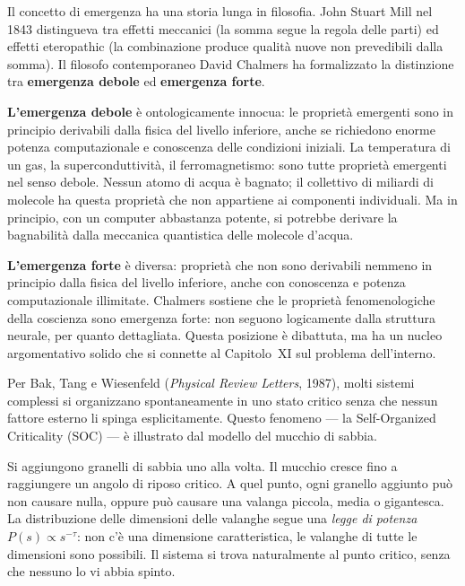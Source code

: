 \documentclass[12pt,a4paper,openany]{book}
\newcommand{\sezione}[1]{\vspace{1.2em}{\large\bfseries #1}\vspace{0.5em}\par}
\begin{document}
\sezione{Emergenza debole e emergenza forte}

Il concetto di emergenza ha una storia lunga in filosofia. John Stuart Mill nel 1843 distingueva tra effetti meccanici (la somma segue la regola delle parti) ed effetti eteropathic (la combinazione produce qualità nuove non prevedibili dalla somma). Il filosofo contemporaneo David Chalmers ha formalizzato la distinzione tra \textbf{emergenza debole} ed \textbf{emergenza forte}.

\textbf{L'emergenza debole} è ontologicamente innocua: le proprietà emergenti sono in principio derivabili dalla fisica del livello inferiore, anche se richiedono enorme potenza computazionale e conoscenza delle condizioni iniziali. La temperatura di un gas, la superconduttività, il ferromagnetismo: sono tutte proprietà emergenti nel senso debole. Nessun atomo di acqua è bagnato; il collettivo di miliardi di molecole ha questa proprietà che non appartiene ai componenti individuali. Ma in principio, con un computer abbastanza potente, si potrebbe derivare la bagnabilità dalla meccanica quantistica delle molecole d'acqua.

\textbf{L'emergenza forte} è diversa: proprietà che non sono derivabili nemmeno in principio dalla fisica del livello inferiore, anche con conoscenza e potenza computazionale illimitate. Chalmers sostiene che le proprietà fenomenologiche della coscienza sono emergenza forte: non seguono logicamente dalla struttura neurale, per quanto dettagliata. Questa posizione è dibattuta, ma ha un nucleo argomentativo solido che si connette al Capitolo~XI sul problema dell'interno.

\sezione{La criticalità auto-organizzata: valanghe, terremoti e il cervello}

Per Bak, Tang e Wiesenfeld (\textit{Physical Review Letters}, 1987), molti sistemi complessi si organizzano spontaneamente in uno stato critico senza che nessun fattore esterno li spinga esplicitamente. Questo fenomeno — la Self-Organized Criticality (SOC) — è illustrato dal modello del mucchio di sabbia.

Si aggiungono granelli di sabbia uno alla volta. Il mucchio cresce fino a raggiungere un angolo di riposo critico. A quel punto, ogni granello aggiunto può non causare nulla, oppure può causare una valanga piccola, media o gigantesca. La distribuzione delle dimensioni delle valanghe segue una \textit{legge di potenza} $P(s) \propto s^{-\tau}$: non c'è una dimensione caratteristica, le valanghe di tutte le dimensioni sono possibili. Il sistema si trova naturalmente al punto critico, senza che nessuno lo vi abbia spinto.
\end{document}
